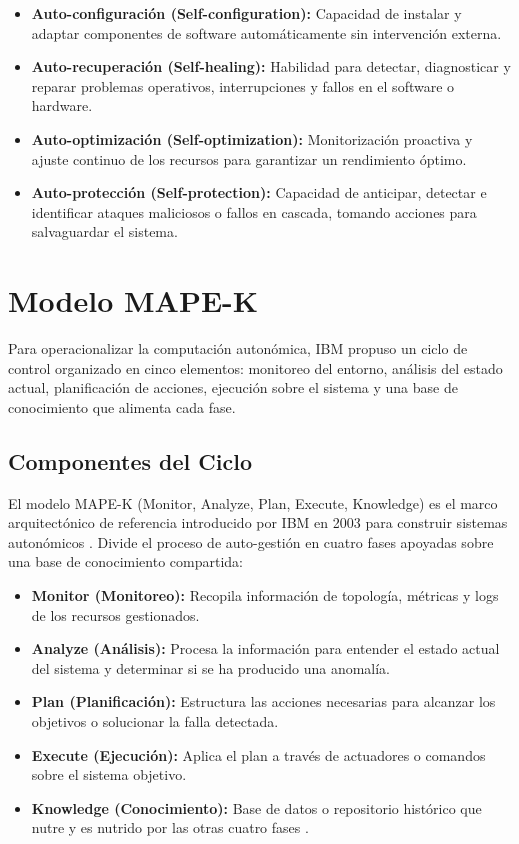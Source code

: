 \begin{itemize}
    \item \textbf{Auto-configuraci\'{o}n (Self-configuration):} Capacidad de instalar y adaptar componentes de software autom\'{a}ticamente sin intervenci\'{o}n externa.
    \item \textbf{Auto-recuperaci\'{o}n (Self-healing):} Habilidad para detectar, diagnosticar y reparar problemas operativos, interrupciones y fallos en el software o hardware.
    \item \textbf{Auto-optimizaci\'{o}n (Self-optimization):} Monitorizaci\'{o}n proactiva y ajuste continuo de los recursos para garantizar un rendimiento \'{o}ptimo.
    \item \textbf{Auto-protecci\'{o}n (Self-protection):} Capacidad de anticipar, detectar e identificar ataques maliciosos o fallos en cascada, tomando acciones para salvaguardar el sistema.
\end{itemize}

\section{Modelo MAPE-K}

Para operacionalizar la computaci\'{o}n auton\'{o}mica, IBM propuso un ciclo de
control organizado en cinco elementos: monitoreo del entorno, an\'{a}lisis del
estado actual, planificaci\'{o}n de acciones, ejecuci\'{o}n sobre el sistema y
una base de conocimiento que alimenta cada fase.

\subsection{Componentes del Ciclo}

El modelo MAPE-K (Monitor, Analyze, Plan, Execute, Knowledge) es el marco arquitect\'{o}nico de referencia introducido por IBM en 2003 para construir sistemas auton\'{o}micos \cite{kephart2003vision}. Divide el proceso de auto-gesti\'{o}n en cuatro fases apoyadas sobre una base de conocimiento compartida:

\begin{itemize}
    \item \textbf{Monitor (Monitoreo):} Recopila informaci\'{o}n de topolog\'{i}a, m\'{e}tricas y logs de los recursos gestionados.
    \item \textbf{Analyze (An\'{a}lisis):} Procesa la informaci\'{o}n para entender el estado actual del sistema y determinar si se ha producido una anomal\'{i}a.
    \item \textbf{Plan (Planificaci\'{o}n):} Estructura las acciones necesarias para alcanzar los objetivos o solucionar la falla detectada.
    \item \textbf{Execute (Ejecuci\'{o}n):} Aplica el plan a trav\'{e}s de actuadores o comandos sobre el sistema objetivo.
    \item \textbf{Knowledge (Conocimiento):} Base de datos o repositorio hist\'{o}rico que nutre y es nutrido por las otras cuatro fases \cite{ibm2006architectural}.
\end{itemize}

